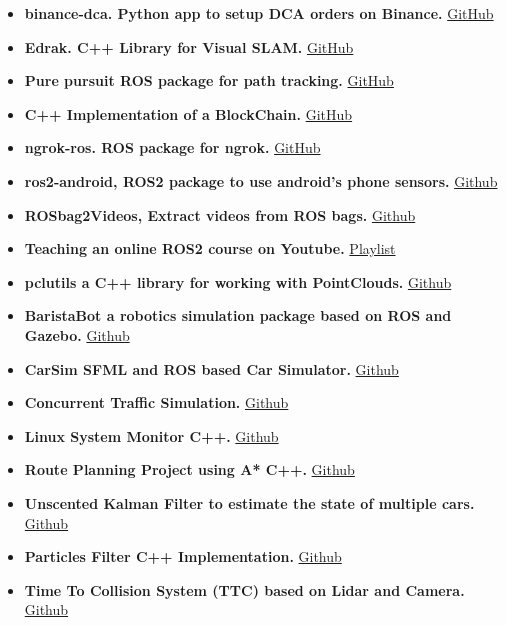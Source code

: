 \documentclass[10pt,a4paper,ragged2e]{altacv}
\begin{document}
\begin{itemize}
\item \textbf{binance-dca. Python app to setup DCA orders on Binance.}
\href{https://github.com/HemaZ/binance-dca}{GitHub}
\item \textbf{Edrak. C++ Library for Visual SLAM.}
\href{https://github.com/HemaZ/Edrak}{GitHub}
\item \textbf{Pure pursuit ROS package for path tracking.}
\href{https://github.com/HemaZ/pure_pursuit}{GitHub}
\item \textbf{C++ Implementation of a BlockChain.}
\href{https://github.com/HemaZ/my_blockchain}{GitHub}
\item \textbf{ngrok-ros. ROS package for ngrok.}
\href{https://github.com/HemaZ/ngrok_ros}{GitHub}
\item \textbf{ros2-android, ROS2 package to use android's phone sensors.}
\href{https://github.com/HemaZ/ros2_android}{Github}
\item \textbf{ROSbag2Videos, Extract videos from ROS bags.}
\href{https://github.com/HemaZ/rosbag_2_videos}{Github}
\item \textbf{Teaching an online ROS2 course on Youtube.}
\href{https://www.youtube.com/playlist?list=PLWIFvNcdSDQupEsNLnAnCI6MwTqvGgkC1}{Playlist}
\item \textbf{pclutils a C++ library for working with PointClouds.}
\href{https://github.com/HemaZ/pcl_utils}{Github}
\item \textbf{BaristaBot a robotics simulation package based on ROS and Gazebo.}
\href{https://github.com/HemaZ/BaristaBot}{Github}
\item \textbf{CarSim SFML and ROS based Car Simulator.}
\href{https://github.com/HemaZ/CarSim}{Github}
\item \textbf{Concurrent Traffic Simulation.}
\href{https://github.com/HemaZ/Concurrent-Traffic-Simulation-CPP}{Github}
\item \textbf{Linux System Monitor C++.}
\href{https://github.com/HemaZ/CppND-System-Monitor}{Github}
\item \textbf{Route Planning Project using A* C++.}
\href{https://github.com/HemaZ/CppND-Route-Planning-Project}{Github}
\item \textbf{Unscented Kalman Filter to estimate the state of multiple cars.}
\href{https://github.com/HemaZ/SFND_Unscented_Kalman_Filter}{Github}
\item \textbf{Particles Filter C++ Implementation.}
\href{https://github.com/HemaZ/particles_filter}{Github}
\item \textbf{Time To Collision System (TTC) based on Lidar and Camera.}
\href{https://github.com/HemaZ/SFND_3D_Object_Tracking}{Github}


\end{itemize}
\end{document}
